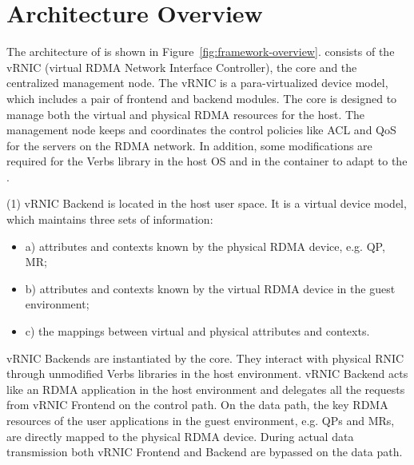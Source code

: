 \section{Architecture Overview} \label{overview}


The architecture of \sys is shown in Figure~\ref{fig:framework-overview}.
\sys consists of the vRNIC (virtual RDMA Network Interface Controller), the \sys core and the centralized management node. The vRNIC is a para-virtualized device model, which includes a pair of frontend and backend modules.
The \sys core is designed to manage both the virtual and physical RDMA resources for the host.
The management node keeps and coordinates the control policies like ACL and QoS for the servers on the RDMA network.
In addition, some modifications are required for the Verbs library in the host OS and in the container to adapt to the \sys.


(1) vRNIC Backend is located in the host user space. It is a virtual device model, which maintains three sets of information:
\begin{itemize}
	\item a) attributes and contexts known by the physical RDMA device, e.g. QP, MR;
	\item b) attributes and contexts known by the virtual RDMA device in the guest environment;
	\item c) the mappings between virtual and physical attributes and contexts.
\end{itemize}

vRNIC Backends are instantiated by the \sys core. They interact with physical RNIC through unmodified Verbs libraries in the host environment. vRNIC Backend acts like an RDMA application in the host environment and delegates all the requests from vRNIC Frontend on the control path. On the data path, the key RDMA resources of the user applications in the guest environment, e.g. QPs and MRs, are directly mapped to the physical RDMA device. During actual data transmission both vRNIC Frontend and Backend are bypassed on the data path.

